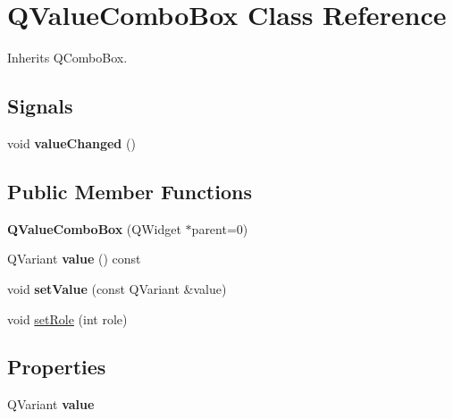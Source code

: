 \hypertarget{class_q_value_combo_box}{}\section{Q\+Value\+Combo\+Box Class Reference}
\label{class_q_value_combo_box}


Inherits Q\+Combo\+Box.

\subsection*{Signals}
\begin{DoxyCompactItemize}
\item 
\mbox{\label{class_q_value_combo_box_a0b8f087567544541949baaad9e0626ed}} 
void {\bfseries value\+Changed} ()
\end{DoxyCompactItemize}
\subsection*{Public Member Functions}
\begin{DoxyCompactItemize}
\item 
\mbox{\label{class_q_value_combo_box_a7b0b30b9a341440940825a1655dc36dc}} 
{\bfseries Q\+Value\+Combo\+Box} (Q\+Widget $\ast$parent=0)
\item 
\mbox{\label{class_q_value_combo_box_a4ecb6352cec2cd8d33e8d0c67ce55f0f}} 
Q\+Variant {\bfseries value} () const
\item 
\mbox{\label{class_q_value_combo_box_af192c68c0c82f33000d8c1be8c013d2d}} 
void {\bfseries set\+Value} (const Q\+Variant \&value)
\item 
void \mbox{\hyperlink{class_q_value_combo_box_a9db5bc48951130e1104322de54f55471}{set\+Role}} (int role)
\end{DoxyCompactItemize}
\subsection*{Properties}
\begin{DoxyCompactItemize}
\item 
\mbox{\label{class_q_value_combo_box_ac487ee6027e1b8b7c211f95d60c45f7c}} 
Q\+Variant {\bfseries value}
\end{DoxyCompactItemize}


